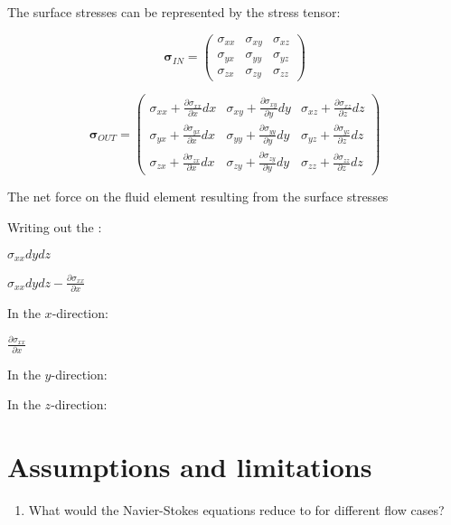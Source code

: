 The surface stresses can be represented by the stress tensor:

\begin{equation}
\bm{\sigma}_{IN} = \left(
\begin{matrix} 
\sigma_{xx} & \sigma_{xy} & \sigma_{xz} \\
\sigma_{yx} & \sigma_{yy} & \sigma_{yz} \\
\sigma_{zx} & \sigma_{zy} & \sigma_{zz}
\end{matrix}
\right)
\end{equation}

\begin{equation}
\bm{\sigma}_{OUT} = \left(
\begin{matrix} 
\sigma_{xx} + \frac{\partial \sigma_{xx}}{\partial x}dx & \sigma_{xy} + \frac{\partial \sigma_{xy}}{\partial y}dy & \sigma_{xz} + \frac{\partial \sigma_{xz}}{\partial z}dz \\
\sigma_{yx} + \frac{\partial \sigma_{yx}}{\partial x}dx & \sigma_{yy} + \frac{\partial \sigma_{yy}}{\partial y}dy & \sigma_{yz} + \frac{\partial \sigma_{yz}}{\partial z}dz \\
\sigma_{zx} + \frac{\partial \sigma_{zx}}{\partial x}dx & \sigma_{zy} + \frac{\partial \sigma_{zy}}{\partial y}dy & \sigma_{zz} + \frac{\partial \sigma_{zz}}{\partial z}dz 
\end{matrix}
\right)
\end{equation}

The net force on the fluid element resulting from the surface stresses

Writing out the :

$\sigma_{xx} dy dz$


$\sigma_{xx} dy dz - \frac{\partial \sigma_{xx}}{\partial x}$ 



In the $x$-direction: 

$\frac{\partial \sigma_{xx}}{\partial x}$ 

In the $y$-direction: 



In the $z$-direction: 









\section{Assumptions and limitations}






\begin{enumerate}

\item What would the Navier-Stokes equations reduce to for different flow cases?

\end{enumerate}
